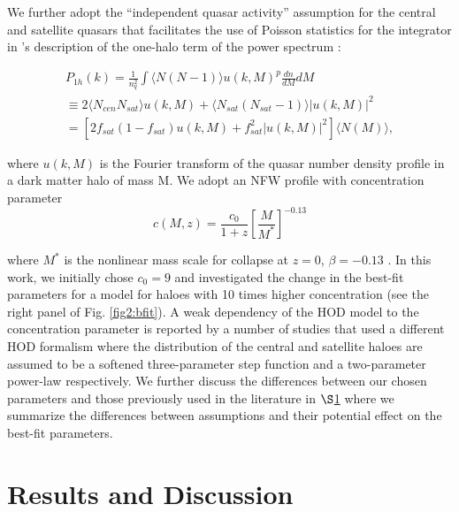 \documentclass[useAMS,usenatbib]{mn2e}
\begin{document}
We further adopt the ``independent quasar activity'' assumption for the central 
and satellite quasars that facilitates the use of Poisson statistics for the 
integrator in \citep{sel00}'s description of the one-halo term of the power 
spectrum \citep{ko12}:

 \begin{multline}
P_{1h}(k) = \frac{1}{n^{2}_{q}} \int \langle N(N-1)\rangle u(k,M)^p \frac{dn}{dM} dM  \\
\equiv 2 \langle N_{cen} N_{sat}\rangle u(k,M) + \langle N_{sat}(N_{sat}-1)\rangle |u(k,M)|^2 \\
%  
= [2 f_{sat}(1-f_{sat}) u(k,M)+f_{sat}^2 |u(k,M)|^2] \langle N(M)\rangle,
 \end{multline}

where $u(k,M)$ is the Fourier transform of the quasar number density profile in 
a dark matter halo of mass M. We adopt an NFW profile \citep{nfw97} with 
concentration parameter
\begin{equation}
c(M,z) = \frac{c_{0}}{1+z}[\frac{M}{M^{*}}]^{-0.13}
\end{equation}

 where $M^{*}$ is the nonlinear mass scale for collapse at $z=0$, $\beta = 
-0.13$ \citep{cs02}. In this work, we initially chose $c_0=9$ and investigated 
the change in the best-fit parameters for a model for haloes with 10 times 
higher concentration (see the right panel of Fig. \ref{fig2:bfit}). A weak 
dependency of the HOD model to the concentration parameter is reported by a 
number of studies \citep{ric12,ric13,sh13} that used a different HOD formalism 
where the distribution of the central and satellite haloes are assumed to be a 
softened three-parameter step function and a two-parameter power-law 
respectively.
 We further discuss the differences between our chosen parameters and those 
previously used in the literature in $\S$\ref{res} where we summarize the 
differences between assumptions and their potential effect on the best-fit 
parameters.    

\section{Results and Discussion}\label{res}
\end{document}
